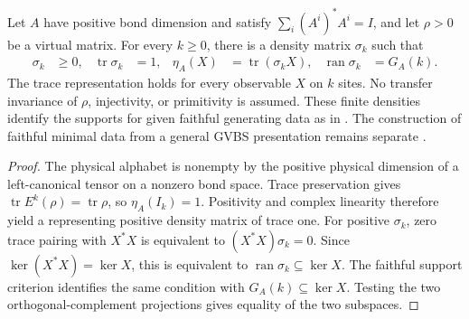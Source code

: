 \begin{lemma}
    \label{thm:local_mps_density_support}
    \leanok
    Let $A$ have positive bond dimension and satisfy
    $\sum_i(A^i)^*A^i=I$, and let $\rho>0$ be a virtual matrix.
    For every $k\geq0$, there is a density matrix $\sigma_k$ such that
    \begin{align}
        \sigma_k                   & \geq0,                         & \operatorname{tr}\sigma_k & =1, &
        \eta_A(X)                  & =\operatorname{tr}(\sigma_kX), &
        \operatorname{ran}\sigma_k & =G_A(k).
        \label{eq:local_mps_density_support}
    \end{align}
    The trace representation holds for every observable $X$ on $k$ sites.
    No transfer invariance of $\rho$, injectivity, or primitivity is assumed.
    These finite densities identify the supports for given faithful
    generating data as in
    \cite[Section~3 and the overlap proof in Section~4]{Nachtergaele1996Spectral}.
    The construction of faithful minimal data from a general GVBS presentation
    remains separate
    \cite{gap:nachtergaele96_infinite_volume_ground_projection}.
\end{lemma}
\begin{proof}\leanok
    The physical alphabet is nonempty by the positive physical dimension of a
    left-canonical tensor on a nonzero bond space. Trace preservation gives
    $\operatorname{tr}E^k(\rho)=\operatorname{tr}\rho$, so
    $\eta_A(I_k)=1$. Positivity and complex linearity therefore yield a
    representing positive density matrix of trace one.
    For positive $\sigma_k$, zero trace pairing with $X^*X$ is equivalent to
    $(X^*X)\sigma_k=0$. Since $\ker(X^*X)=\ker X$, this is equivalent to
    $\operatorname{ran}\sigma_k\subseteq\ker X$. The faithful support criterion
    identifies the same condition with $G_A(k)\subseteq\ker X$.
    Testing the two orthogonal-complement projections gives equality of
    the two subspaces.
\end{proof}

